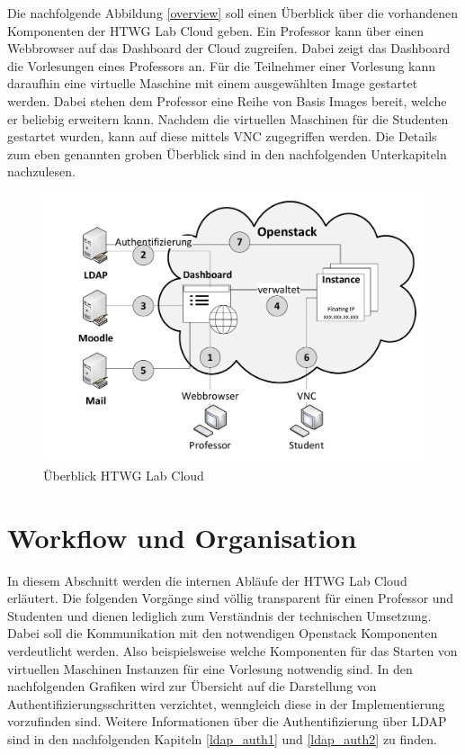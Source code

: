 Die nachfolgende Abbildung \autoref{overview} soll einen Überblick über 
die vorhandenen Komponenten der HTWG Lab Cloud geben. Ein Professor kann über einen
Webbrowser auf das Dashboard der Cloud zugreifen. Dabei zeigt das Dashboard die Vorlesungen
eines Professors an. Für die Teilnehmer einer Vorlesung kann daraufhin eine virtuelle Maschine
mit einem ausgewählten Image gestartet werden. Dabei stehen dem Professor eine Reihe von Basis
Images bereit, welche er beliebig erweitern kann.
Nachdem die virtuellen Maschinen für die Studenten gestartet wurden, kann auf diese mittels
VNC zugegriffen werden.
Die Details zum eben genannten groben Überblick sind in den nachfolgenden 
Unterkapiteln nachzulesen.

\begin{figure}[H]
	\centering
	\includegraphics[scale=0.4]{img/overview.pdf}
\caption{Überblick HTWG Lab Cloud}
\label{overview}
\FloatBarrier
\end{figure}

\section{Workflow und Organisation}
In diesem Abschnitt werden die internen Abläufe der HTWG Lab Cloud erläutert. Die folgenden
Vorgänge sind völlig transparent für einen Professor und Studenten und dienen lediglich zum
Verständnis der technischen Umsetzung.
Dabei soll die Kommunikation mit den notwendigen Openstack Komponenten verdeutlicht werden.
Also beispielsweise welche Komponenten für das Starten von virtuellen Maschinen Instanzen 
für eine Vorlesung notwendig sind.
In den nachfolgenden Grafiken wird zur Übersicht auf die Darstellung von
Authentifizierungsschritten verzichtet, wenngleich diese in der Implementierung vorzufinden sind.
Weitere Informationen über die Authentifizierung über LDAP sind in den nachfolgenden
Kapiteln \ref{ldap_auth1} und \ref{ldap_auth2} zu finden.


